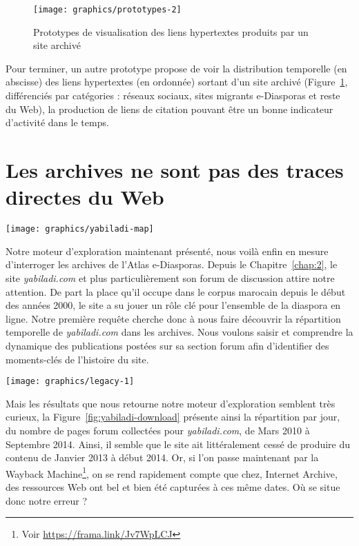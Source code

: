 \documentclass[symmetric,justified,marginals=raggedouter]{tufte-book}
\begin{document}
\begin{figure}%
  \texttt{[image: graphics/prototypes-2]}
  \caption{Prototypes de visualisation des liens hypertextes produits par un site archivé}
  \label{fig:prototypes-2}
\end{figure}

\noindent Pour terminer, un autre prototype propose de voir la distribution temporelle (en abscisse) des liens hypertextes (en ordonnée) sortant d'un site archivé (Figure~\ref{fig:prototypes-2}, différenciés par catégories : réseaux sociaux, sites migrants e-Diasporas et reste du Web), la production de liens de citation pouvant être un bonne indicateur d'activité dans le temps. 

\section{Les archives ne sont pas des traces directes du Web}
\label{sec:4_legacy}

\begin{marginfigure}%
  \texttt{[image: graphics/yabiladi-map]}
  \vspace*{0.2cm}  
  \caption{\textit{yabiladi.com} (rouge) dans l'e-Diaspora marocaine (Section \ref{sec:2_atlas})}
  \label{fig:yabiladi-map}
\end{marginfigure} 

\noindent Notre moteur d'exploration maintenant présenté, nous voilà enfin en mesure d'interroger les archives de l'Atlas e-Diasporas. Depuis le Chapitre~\ref{chap:2}, le site \textit{yabiladi.com} et plus particulièrement son forum de discussion attire notre attention. De part la place qu'il occupe dans le corpus marocain depuis le début des années 2000, le site a su jouer un rôle clé pour l'ensemble de la diaspora en ligne. Notre première requête cherche donc à nous faire découvrir la répartition temporelle de \textit{yabiladi.com} dans les archives. Nous voulons saisir et comprendre la dynamique des publications postées sur sa section forum afin d'identifier des moments-clés de l'histoire du site. 

\begin{figure*}%
  \texttt{[image: graphics/legacy-1]}
  \caption{Distribution du nombre de pages archivées par jours pour \textit{yabiladi.com}}
  \label{fig:yabiladi-download}
\end{figure*}

\noindent Mais les résultats que nous retourne notre moteur d'exploration semblent très curieux, la Figure~\ref{fig:yabiladi-download} présente ainsi la répartition par jour, du nombre de pages forum collectées pour \textit{yabiladi.com}, de Mars 2010 à Septembre 2014. Ainsi, il semble que le site ait littéralement cessé de produire du contenu de Janvier 2013 à début 2014. Or, si l'on passe maintenant par la Wayback Machine\footnote{\RaggedOuter Voir \url{https://frama.link/Jv7WpLCJ}}, on se rend rapidement compte que chez, Internet Archive, des ressources Web ont bel et bien été capturées à ces même dates. Où se situe donc notre erreur ?
\end{document}
